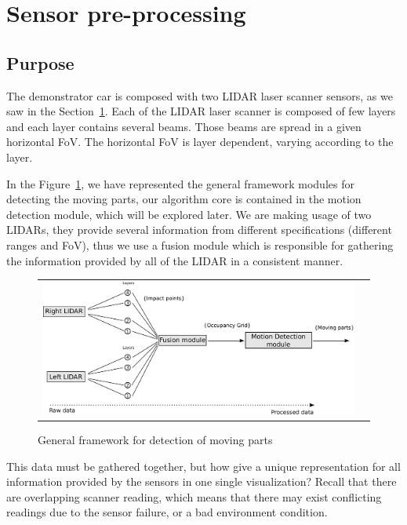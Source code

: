 \section{Sensor pre-processing} %
\label{sec:sensor:fusion}


\subsection{Purpose}

The demonstrator car is composed with two LIDAR laser scanner sensors, as we saw in the Section~\ref{sec:sensor:fusion}. Each of the LIDAR laser scanner is composed of few layers and each layer contains several beams. Those beams are spread in a given horizontal FoV. The horizontal FoV is layer dependent, varying according to the layer.

In the Figure~\ref{fig:motion:framework}, we have represented the general framework modules for detecting the moving parts, our algorithm core is contained in the motion detection module, which will be explored later. We are making usage of two LIDARs, they provide several information from different specifications (different ranges and FoV), thus we use a fusion module which is responsible for gathering the information provided by all of the LIDAR in a consistent manner.

\begin{figure}[H]
   \centering
     \begin{tabular}{lr}
       \includegraphics[scale=0.30]{img/fig:motion:framework}
     \end{tabular}
   \caption{General framework for detection of moving parts}
   \label{fig:motion:framework}
\end{figure}

This data must be gathered together, but how give a unique representation for all information provided by the sensors in one single visualization? Recall that there are overlapping scanner reading, which means that there may exist conflicting readings due to the sensor failure, or a bad environment condition.

